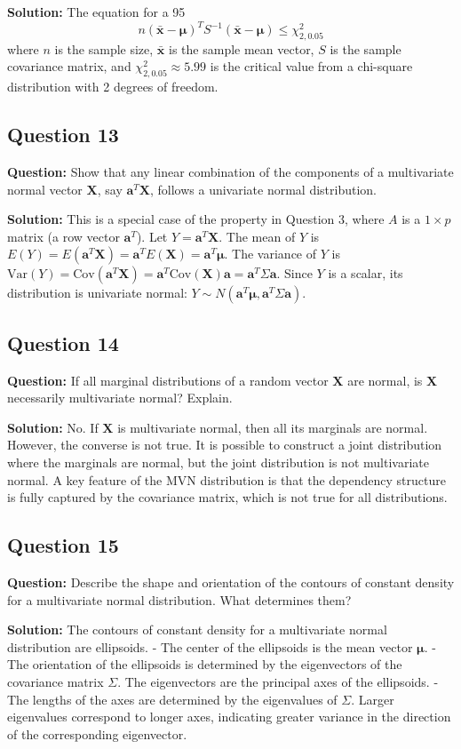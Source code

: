\textbf{Solution:}
The equation for a 95%
$$ n(\bar{\mathbf{x}} - \boldsymbol{\mu})^T S^{-1} (\bar{\mathbf{x}} - \boldsymbol{\mu}) \le \chi^2_{2, 0.05} $$
where $n$ is the sample size, $\bar{\mathbf{x}}$ is the sample mean vector, $S$ is the sample covariance matrix, and $\chi^2_{2, 0.05} \approx 5.99$ is the critical value from a chi-square distribution with 2 degrees of freedom.

\subsection*{Question 13}
\textbf{Question:} Show that any linear combination of the components of a multivariate normal vector $\mathbf{X}$, say $\mathbf{a}^T\mathbf{X}$, follows a univariate normal distribution.

\textbf{Solution:}
This is a special case of the property in Question 3, where $A$ is a $1 \times p$ matrix (a row vector $\mathbf{a}^T$).
Let $Y = \mathbf{a}^T\mathbf{X}$. The mean of $Y$ is $E(Y) = E(\mathbf{a}^T\mathbf{X}) = \mathbf{a}^T E(\mathbf{X}) = \mathbf{a}^T\boldsymbol{\mu}$.
The variance of $Y$ is $\text{Var}(Y) = \text{Cov}(\mathbf{a}^T\mathbf{X}) = \mathbf{a}^T \text{Cov}(\mathbf{X}) \mathbf{a} = \mathbf{a}^T\Sigma\mathbf{a}$.
Since $Y$ is a scalar, its distribution is univariate normal: $Y \sim N(\mathbf{a}^T\boldsymbol{\mu}, \mathbf{a}^T\Sigma\mathbf{a})$.

\subsection*{Question 14}
\textbf{Question:} If all marginal distributions of a random vector $\mathbf{X}$ are normal, is $\mathbf{X}$ necessarily multivariate normal? Explain.

\textbf{Solution:}
No. If $\mathbf{X}$ is multivariate normal, then all its marginals are normal. However, the converse is not true. It is possible to construct a joint distribution where the marginals are normal, but the joint distribution is not multivariate normal. A key feature of the MVN distribution is that the dependency structure is fully captured by the covariance matrix, which is not true for all distributions.

\subsection*{Question 15}
\textbf{Question:} Describe the shape and orientation of the contours of constant density for a multivariate normal distribution. What determines them?

\textbf{Solution:}
The contours of constant density for a multivariate normal distribution are ellipsoids.
- The center of the ellipsoids is the mean vector $\boldsymbol{\mu}$.
- The orientation of the ellipsoids is determined by the eigenvectors of the covariance matrix $\Sigma$. The eigenvectors are the principal axes of the ellipsoids.
- The lengths of the axes are determined by the eigenvalues of $\Sigma$. Larger eigenvalues correspond to longer axes, indicating greater variance in the direction of the corresponding eigenvector.
